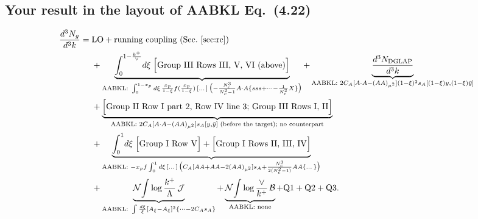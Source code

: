 \documentclass[9pt]{article}
\numberwithin{equation}{section}
\begin{document}
\subsection{Your result in the layout of AABKL Eq.~(4.22)}
\begin{align}
\frac{d^3N_g}{d^3k}={}&{\rm LO}+\text{running coupling (Sec.~\ref{sec:rc})}\notag\\
&+\underbrace{\int_{0}^{1-\frac{k^+}{\vee}}\!d\xi\;\Big[\text{Group III Rows III, V, VI (above)}\Big]}_{\text{AABKL: }\int_0^{1-x_p}d\xi\,\frac{x_p}{1-\xi}f(\frac{x_p}{1-\xi})\,[\dots]\,\big(-\frac{N_c^3}{N_c^2-1}A\cdot A\{sss+\dots-\frac{1}{N_c^2}X\}\big)}
+\underbrace{\frac{d^3N_{\rm DGLAP}}{d^3k}}_{\text{AABKL: }2C_A[A\cdot A-(AA)_{\mu^2}](1-\xi)^2s_A[(1-\xi)y,(1-\xi)\bar y]}\notag\\
&+\underbrace{\Big[\text{Group II Row I part 2, Row IV line 3; Group III Rows I, II}\Big]}_{\text{AABKL: }2C_A[A\cdot A-(AA)_{\mu^2}]s_A[y,\bar y]\text{ (before the target); no counterpart}}\notag\\
&+\underbrace{\int_0^1\!d\xi\;\Big[\text{Group I Row V}\Big]+\Big[\text{Group I Rows II, III, IV}\Big]}_{\text{AABKL: }-x_pf\int_0^1d\xi\,[\dots]\,\big(C_A[AA+AA-2(AA)_{\mu^2}]s_A+\frac{N_c^3}{2(N_c^2-1)}AA\{\dots\}\big)}\notag\\
&+\underbrace{\mathcal N\!\int\log\frac{k^+}{\Lambda}\,\mathcal J}_{\text{AABKL: }\int\frac{d\xi}{\xi}[A_\xi-A_\xi]^2\{\dots-2C_As_A\}}
+\underbrace{\mathcal N\!\int\log\frac{\vee}{k^+}\,\mathcal B}_{\text{AABKL: none}}+\text{Q1}+\text{Q2}+\text{Q3}.
\end{align}
\end{document}
